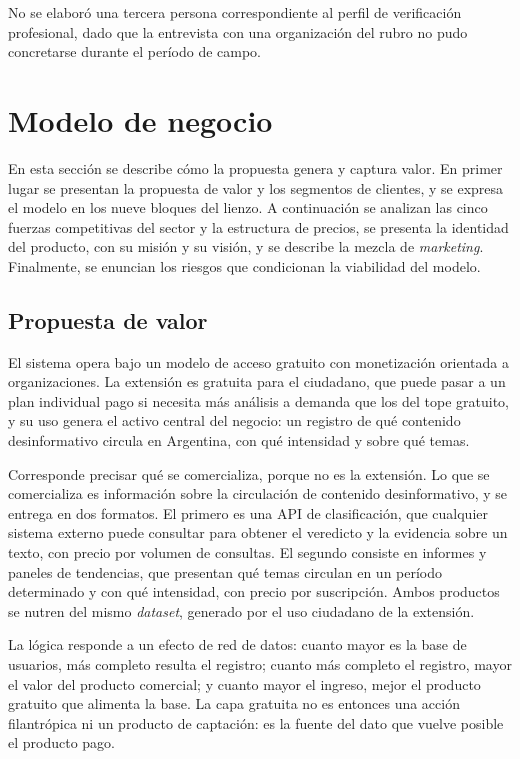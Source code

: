 No se elaboró una tercera persona correspondiente al perfil de verificación profesional, dado que la entrevista con una organización del rubro no pudo concretarse durante el período de campo.

\section{Modelo de negocio}
\label{sec:negocio}

En esta sección se describe cómo la propuesta genera y captura valor. En primer lugar se presentan la propuesta de valor y los segmentos de clientes, y se expresa el modelo en los nueve bloques del lienzo. A continuación se analizan las cinco fuerzas competitivas del sector y la estructura de precios, se presenta la identidad del producto, con su misión y su visión, y se describe la mezcla de \textit{marketing}. Finalmente, se enuncian los riesgos que condicionan la viabilidad del modelo.

\subsection{Propuesta de valor}

El sistema opera bajo un modelo de acceso gratuito con monetización orientada a organizaciones. La extensión es gratuita para el ciudadano, que puede pasar a un plan individual pago si necesita más análisis a demanda que los del tope gratuito, y su uso genera el activo central del negocio: un registro de qué contenido desinformativo circula en Argentina, con qué intensidad y sobre qué temas.

Corresponde precisar qué se comercializa, porque no es la extensión. Lo que se comercializa es información sobre la circulación de contenido desinformativo, y se entrega en dos formatos. El primero es una API de clasificación, que cualquier sistema externo puede consultar para obtener el veredicto y la evidencia sobre un texto, con precio por volumen de consultas. El segundo consiste en informes y paneles de tendencias, que presentan qué temas circulan en un período determinado y con qué intensidad, con precio por suscripción. Ambos productos se nutren del mismo \textit{dataset}, generado por el uso ciudadano de la extensión.

La lógica responde a un efecto de red de datos: cuanto mayor es la base de usuarios, más completo resulta el registro; cuanto más completo el registro, mayor el valor del producto comercial; y cuanto mayor el ingreso, mejor el producto gratuito que alimenta la base. La capa gratuita no es entonces una acción filantrópica ni un producto de captación: es la fuente del dato que vuelve posible el producto pago.

